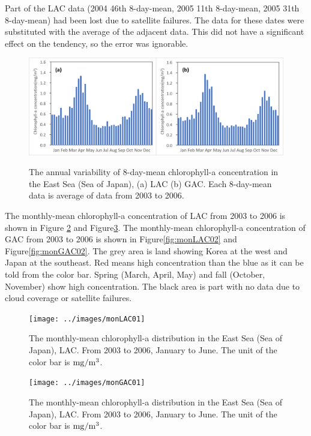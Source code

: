 Part of the LAC data (2004 46th 8-day-mean, 2005 11th 8-day-mean, 2005 31th 8-day-mean) had been lost due to satellite failures. The data for these dates were substituted with the average of the adjacent data. This did not have a significant effect on the tendency, so the error was ignorable.
  
 \begin{figure}[b]
	\centering
	\includegraphics[width=1.0\linewidth]{../images/annualwky}\\
	\caption{The annual variability of 8-day-mean chlorophyll-a concentration in the East Sea (Sea of Japan), (a) LAC (b) GAC. Each 8-day-mean data is average of data from 2003 to 2006.}
	\label{fig:annuawkly}
\end{figure}

  
 
The monthly-mean chlorophyll-a concentration of LAC from 2003 to 2006 is shown in Figure \ref{fig:monLAC01} and Figure\ref{fig:monGAC01}. The monthly-mean chlorophyll-a concentration of GAC from 2003 to 2006 is shown in Figure\ref{fig:monLAC02} and Figure\ref{fig:monGAC02}. The grey area is land showing Korea at the west and Japan at the southeast. Red means high concentration than the blue as it can be told from the color bar. Spring (March, April, May) and fall (October, November) show high concentration. The black area is part with no data due to cloud coverage or satellite failures. 

\begin{figure}[t]
	\centering
	\texttt{[image: ../images/monLAC01]}\\
	\caption{The monthly-mean chlorophyll-a distribution in the East Sea (Sea of Japan), LAC. From 2003 to 2006, January to June. The unit of the color bar is $\rm mg/m^3$.}
	\label{fig:monLAC01}
\end{figure}
    
\begin{figure}[p]
	\centering
	\texttt{[image: ../images/monGAC01]}\\
	\caption{The monthly-mean chlorophyll-a distribution in the East Sea (Sea of Japan), LAC. From 2003 to 2006, January to June. The unit of the color bar is $\rm mg/m^3$.}
	\label{fig:monGAC01}
\end{figure}


